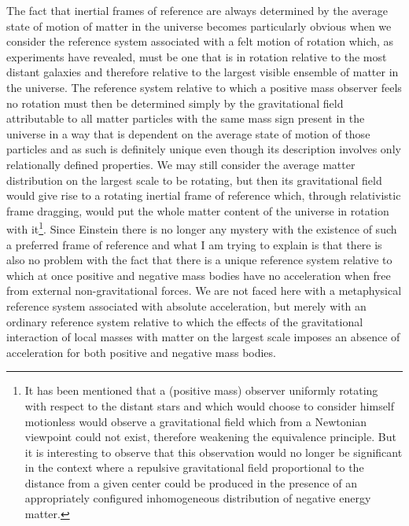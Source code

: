 \documentclass[notitlepage,12pt]{report}
\begin{document}
The fact that inertial frames of reference are always determined by the average state of motion of matter in the universe becomes particularly obvious when we consider the reference system associated with a felt motion of rotation which, as experiments have revealed, must be one that is in rotation relative to the most distant galaxies and therefore relative to the largest visible ensemble of matter in the universe. The reference system relative to which a positive mass observer feels no rotation must then be determined simply by the gravitational field attributable to all matter particles with the same mass sign present in the universe in a way that is dependent on the average state of motion of those particles and as such is definitely unique even though its description involves only relationally defined properties. We may still consider the average matter distribution on the largest scale to be rotating, but then its gravitational field would give rise to a rotating inertial frame of reference which, through relativistic frame dragging, would put the whole matter content of the universe in rotation with it\footnote{It has been mentioned that a (positive mass) observer uniformly rotating with respect to the distant stars and which would choose to consider himself motionless would observe a gravitational field which from a Newtonian viewpoint could not exist, therefore weakening the equivalence principle. But it is interesting to observe that this observation would no longer be significant in the context where a repulsive gravitational field proportional to the distance from a given center could be produced in the presence of an appropriately configured inhomogeneous distribution of negative energy matter.}. Since Einstein there is no longer any mystery with the existence of such a preferred frame of reference and what I am trying to explain is that there is also no problem with the fact that there is a unique reference system relative to which at once positive and negative mass bodies have no acceleration when free from external non-gravitational forces. We are not faced here with a metaphysical reference system associated with absolute acceleration, but merely with an ordinary reference system relative to which the effects of the gravitational interaction of local masses with matter on the largest scale imposes an absence of acceleration for both positive and negative mass bodies.
\end{document}
